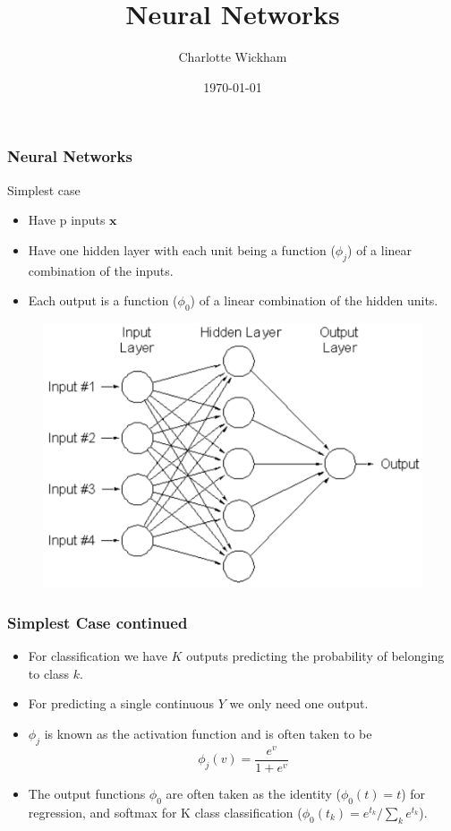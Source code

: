 \documentclass{beamer}
\title{Neural Networks}
\author{Charlotte Wickham}
\date{\today}
\begin{document}
\frame{\titlepage}

\begin{frame}
	\frametitle{Neural Networks}
	Simplest case
	\begin{itemize}
		\item Have p inputs $\pmb{x}$
		\item Have one hidden layer with each unit being a function ($\phi_j$) of a linear combination of the inputs. 
		\item Each output is a function ($\phi_0$) of a linear combination of the hidden units.
	\end{itemize}
	
	\begin{figure}
	\includegraphics{nnet.pdf}
	\end{figure}
	
\end{frame}

\begin{frame}
	\frametitle{Simplest Case continued}	
	\begin{itemize}
		\item For classification we have $K$ outputs predicting  the probability of belonging to class $k$.
		\item For predicting a single continuous $Y$ we only need one output.
		\item $\phi_j$ is known as the activation function and is often taken to be 
		\[
		\phi_j(v) = \frac{e^v}{1 + e^{v}}
		\]
		\item The output functions $\phi_0$ are often taken as the identity ($\phi_0(t) = t$) for regression, and softmax for K class classification  ($\phi_0(t_k) = e^{t_k} / \sum_k e^{t_k}$).
	\end{itemize}
\end{frame}
\end{document}
